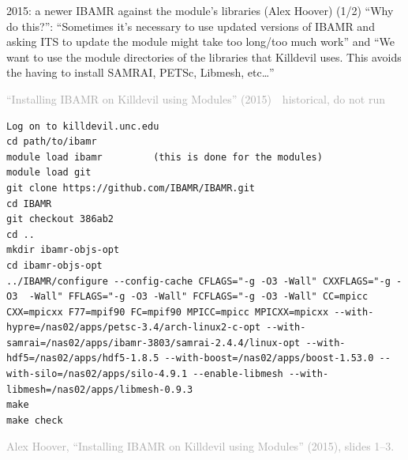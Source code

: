 \documentclass[aspectratio=169,11pt]{beamer}
\newcommand{\sourcecredit}[1]{\vfill\begin{flushright}\tiny\textcolor{DarkGray}{#1}\end{flushright}}
\newcommand{\hist}[1]{{\tiny\sffamily\textcolor{DarkGray}{#1\ \textbullet\ historical, do not run}}\par\nointerlineskip\vspace{0.3mm}}
\begin{document}
\begin{frame}[fragile]{2015: a newer IBAMR against the module's libraries (Alex Hoover) (1/2)}
\label{fr:hoover}
\small ``Why do this?'': ``Sometimes it's necessary to use updated versions of IBAMR and asking ITS to update the module might take too long/too much work'' and ``We want to use the module directories of the libraries that Killdevil uses. This avoids the having to install SAMRAI, PETSc, Libmesh, etc\ldots''

\vspace{1mm}
\hist{``Installing IBAMR on Killdevil using Modules'' (2015)}
\begin{lstlisting}[style=hist]
Log on to killdevil.unc.edu
cd path/to/ibamr
module load ibamr         (this is done for the modules)
module load git
git clone https://github.com/IBAMR/IBAMR.git
cd IBAMR
git checkout 386ab2
cd ..
mkdir ibamr-objs-opt
cd ibamr-objs-opt
../IBAMR/configure --config-cache CFLAGS="-g -O3 -Wall" CXXFLAGS="-g -O3  -Wall" FFLAGS="-g -O3 -Wall" FCFLAGS="-g -O3 -Wall" CC=mpicc CXX=mpicxx F77=mpif90 FC=mpif90 MPICC=mpicc MPICXX=mpicxx --with-hypre=/nas02/apps/petsc-3.4/arch-linux2-c-opt --with-samrai=/nas02/apps/ibamr-3803/samrai-2.4.4/linux-opt --with-hdf5=/nas02/apps/hdf5-1.8.5 --with-boost=/nas02/apps/boost-1.53.0 --with-silo=/nas02/apps/silo-4.9.1 --enable-libmesh --with-libmesh=/nas02/apps/libmesh-0.9.3
make
make check
\end{lstlisting}
\sourcecredit{Alex Hoover, ``Installing IBAMR on Killdevil using Modules'' (2015), slides 1--3.}
\end{frame}
\end{document}
